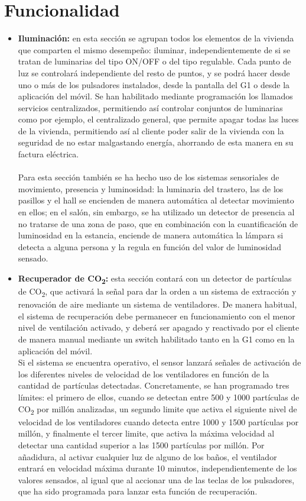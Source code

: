 \section{Funcionalidad}

\begin{itemize}
\item \textbf{Iluminación: }en esta sección se agrupan todos los elementos de la vivienda que comparten el mismo desempeño: iluminar, independientemente de si se tratan de luminarias del tipo ON/OFF o del tipo regulable. Cada punto de luz se controlará independiente del resto de puntos, y se podrá hacer desde uno o más de los pulsadores instalados, desde la pantalla del G1 o desde la aplicación del móvil. Se han habilitado mediante programación los llamados servicios centralizados, permitiendo así controlar conjuntos de luminarias como por ejemplo, el centralizado general, que permite apagar todas las luces de la vivienda, permitiendo así al cliente poder salir de la vivienda con la seguridad de no estar malgastando energía, ahorrando de esta manera en su factura eléctrica. \\\\ Para esta sección también se ha hecho uso de los sistemas sensoriales de movimiento, presencia y luminosidad: la luminaria del trastero, las de los pasillos y el hall se encienden de manera automática al detectar movimiento en ellos; en el salón, sin embargo, se ha utilizado un detector de presencia al no tratarse de una zona de paso, que en combinación con la cuantificación de luminosidad en la estancia, enciende de manera automática la lámpara si detecta a alguna persona y la regula en función del valor de luminosidad sensado.\\
\item \textbf{Recuperador de CO\textsubscript{2}: }esta sección contará con un detector de partículas de CO\textsubscript{2}, que activará la señal para dar la orden a un sistema de extracción y renovación de aire mediante un sistema de ventiladores. De manera habitual, el sistema de recuperación debe permanecer en funcionamiento con el menor nivel de ventilación activado, y deberá ser apagado y reactivado por el cliente de manera manual mediante un switch habilitado tanto en la G1 como en la aplicación del móvil. \\ 
Si el sistema se encuentra operativo, el sensor lanzará señales de activación de los diferentes niveles de velocidad de los ventiladores en función de la cantidad de partículas detectadas. Concretamente, se han programado tres límites: el primero de ellos, cuando se detectan entre 500 y 1000 partículas de CO\textsubscript{2} por millón analizadas, un segundo limite que activa el siguiente nivel de velocidad de los ventiladores cuando detecta entre 1000 y 1500 partículas por millón, y finalmente el tercer limite, que activa la máxima velocidad al detectar una cantidad superior a las 1500 partículas por millón. Por añadidura, al activar cualquier luz de alguno de los baños, el ventilador entrará en velocidad máxima durante 10 minutos, independientemente de los valores sensados, al igual que al accionar una de las teclas de los pulsadores, que ha sido programada para lanzar esta función de recuperación.\\

\end{itemize}
